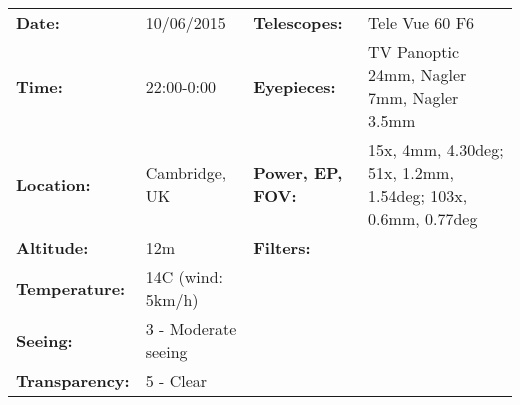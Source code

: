 \begin{tabular}{ p{0.9in} p{1.3in} p{1.2in} p{5.2in}}
{\bf Date:} & 10/06/2015 & {\bf Telescopes:} & Tele Vue 60 F6 \\ 
{\bf Time:} & 22:00-0:00 & {\bf Eyepieces:} & TV Panoptic 24mm, Nagler 7mm, Nagler 3.5mm \\ 
{\bf Location:} & Cambridge, UK & {\bf Power, EP, FOV:} & 15x, 4mm, 4.30deg; 51x, 1.2mm, 1.54deg; 103x, 0.6mm, 0.77deg \\ 
{\bf Altitude:} & 12m & {\bf Filters:} &  \\ 
{\bf Temperature:} & 14C (wind: 5km/h) & & \\ 
{\bf Seeing:} & 3 - Moderate seeing & & \\ 
{\bf Transparency:} & 5 - Clear & & \\ 
\end{tabular}

